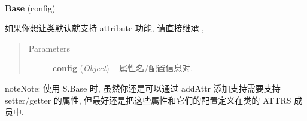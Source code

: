 \documentclass[letterpaper,10pt,english]{sphinxmanual}
\begin{document}
\begin{fulllineitems}
\label{api/core/base/base:attribute.Base}~
\begin{DUlineblock}{0em}
\item[] \textbf{Base} (config)
\item[] 如果你想让类默认就支持 attribute 功能, 请直接继承 ,
\end{DUlineblock}
\begin{quote}\begin{description}
\item[{Parameters}] \leavevmode
\textbf{config} (\emph{Object}) -- 属性名/配置信息对.

\end{description}\end{quote}

\begin{notice}{note}{Note:}
使用 S.Base 时, 虽然你还是可以通过 addAttr 添加支持需要支持 setter/getter 的属性, 但最好还是把这些属性和它们的配置定义在类的 ATTRS 成员中.
\end{notice}

\end{fulllineitems}
\end{document}
